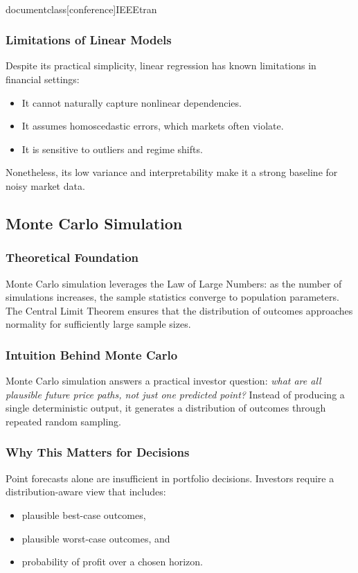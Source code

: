 \\documentclass[conference]{IEEEtran}
\begin{document}
\subsubsection{Limitations of Linear Models}
Despite its practical simplicity, linear regression has known limitations in financial settings:
\begin{itemize}
    \item It cannot naturally capture nonlinear dependencies.
    \item It assumes homoscedastic errors, which markets often violate.
    \item It is sensitive to outliers and regime shifts.
\end{itemize}
Nonetheless, its low variance and interpretability make it a strong baseline for noisy market data.

\subsection{Monte Carlo Simulation}

\subsubsection{Theoretical Foundation}
Monte Carlo simulation leverages the Law of Large Numbers: as the number of simulations increases, the sample statistics converge to population parameters. The Central Limit Theorem ensures that the distribution of outcomes approaches normality for sufficiently large sample sizes.

\subsubsection{Intuition Behind Monte Carlo}
Monte Carlo simulation answers a practical investor question: \emph{what are all plausible future price paths, not just one predicted point?} Instead of producing a single deterministic output, it generates a distribution of outcomes through repeated random sampling.

\subsubsection{Why This Matters for Decisions}
Point forecasts alone are insufficient in portfolio decisions. Investors require a distribution-aware view that includes:
\begin{itemize}
    \item plausible best-case outcomes,
    \item plausible worst-case outcomes, and
    \item probability of profit over a chosen horizon.
\end{itemize}
\end{document}
